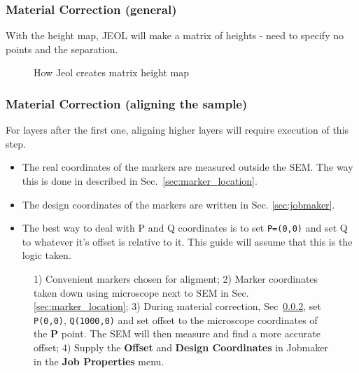 \subsubsection{Material Correction (general)}
With the height map, JEOL will make a matrix of heights - need to specify no points and the separation.

\begin{figure}[h]
  \centering
  \caption{\small How Jeol creates matrix height map\label{fig:jeol_height_map}}
\end{figure}

\subsubsection{Material Correction (aligning the sample)}
\label{sec:material-correction}

\begin{framed}\noindent
  For layers after the first one,  aligning higher layers will require execution
  of this step.
  \begin{itemize}
  \item The  real coordinates of the  markers are measured outside  the SEM. The
    way this is done in described in Sec.~\ref{sec:marker_location}.
  \item   The   design    coordinates   of   the   markers    are   written   in
    Sec. \ref{sec:jobmaker}.
  \item The best way to deal with P and Q coordinates is to set \texttt{P=(0,0)}
    and set Q to whatever it's offset  is relative to it. This guide will assume
    that this is the logic taken.
  \end{itemize}
\end{framed}

\begin{figure}[h]
  \centering {}
  \caption{\small  1)   Convenient  markers  chosen  for   aligment;  2)  Marker
    coordinates    taken    down   using    microscope    next    to   SEM    in
    Sec.\ref{sec:marker_location};     3)     During    material     correction,
    Sec~\ref{sec:material-correction},  set \texttt{P(0,0)},  \texttt{Q(1000,0)}
    and set  offset to the microscope  coordinates of the \textbf{P}  point. The
    SEM  will then  measure  and find  a  more accurate  offset;  4) Supply  the
    \textbf{Offset}  and   \textbf{Design  Coordinates}   in  Jobmaker   in  the
    \textbf{Job Properties} menu.}
\end{figure}

